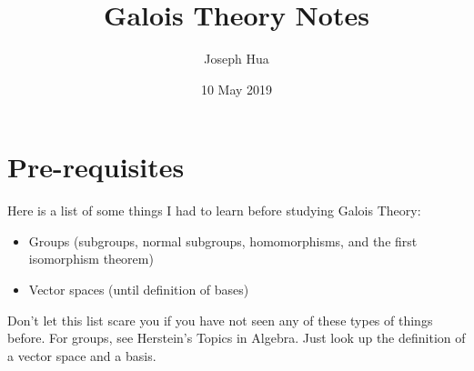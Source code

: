 \documentclass{article}
\theoremstyle{definitionstyle}
\theoremstyle{lemmastyle}
\theoremstyle{remark}
\begin{document}
\title{Galois Theory Notes}
\author{Joseph Hua}
\date{10 May 2019}
\maketitle

\section{Pre-requisites}
Here is a list of some things I had to learn before studying Galois Theory:
\begin{itemize}
  \item Groups (subgroups, normal subgroups, homomorphisms, and the first isomorphism theorem)
  \item Vector spaces (until definition of bases)
\end{itemize}

Don't let this list scare you if you have not seen any of these types of things before. For groups, see Herstein's Topics in Algebra. Just look up the definition of a vector space and a basis.
\end{document}
